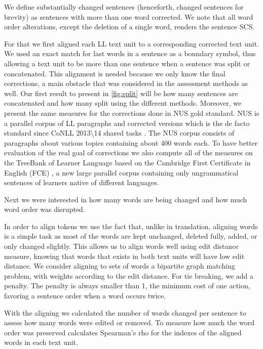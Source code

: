 \documentclass[english]{article}
\begin{document}
We define substantially changed sentences (henceforth, changed sentences for brevity)
as sentences with more than one word corrected. We note that all word order alterations, except the deletion
of a single word, renders the sentence SCS.

For that we first aligned each LL text unit
to a corresponding corrected text unit. We used an exact match for last words in a sentence as a boundary symbol, thus allowing a text unit to be more than one sentence when a sentence was split or concatenated. 
This alignment is needed because we only know the final corrections, a main obstacle that was considered
in the assessment methods as well\cite{dahlmeier2012better}.
Our first result to present in \ref{fig:split} will be how many sentences are concatenated and
how many split using the different methods. Moreover, we present the same measures for the corrections done in  NUS\cite{dahlmeier2013building} gold standard. NUS is a parallel
corpus of LL paragraphs and corrected versions which is the de
facto standard since CoNLL 2013\textbackslash{}14 shared tasks \cite{kao2013conll,ng2014conll}.
The NUS corpus consists of paragraphs about
various topics containing about 400 words each.
To have better evaluation of the real goal of corrections we also
compute all of the measures on the TreeBank of Learner Language \cite{berzak2016universal}based
on the Cambridge First Certificate in English (FCE) \cite{yannakoudakis2011new},
a new large parallel corpus containing only ungrammatical sentences of learners native of different languages.

Next we were interested in how many words are being changed and how much word order was disrupted. 

In order to align tokens we use the fact that, unlike in translation,
aligning words is a simple task as most of the words are kept unchanged,
deleted fully, added, or only changed slightly. This allows us to
align words well using edit distance measure, knowing that words that
exists in both text units will have low edit distance. We consider
aligning to sets of words a bipartite graph matching problem, with
weights according to the edit distance. For tie breaking, we add a
penalty. The penalty is always smaller than 1, the minimum cost of
one action, favoring a sentence order when a word occurs twice.
 
With the aligning we calculated the number of words changed per sentence to assess how many words were edited or removed. 
To measure how much the word order was preserved
calculates Spearman's rho for the indexes of the aligned words in each text unit.
\end{document}

